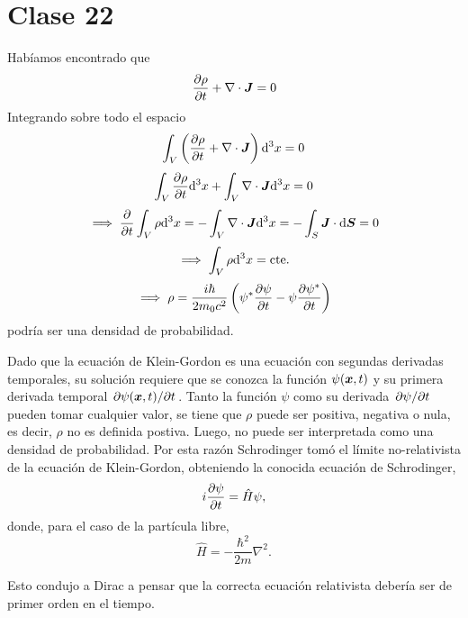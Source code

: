 \section{Clase 22}
Habíamos encontrado que
\begin{equation}
  \pdv{\rho }{t}+\nabla\cdot\vb*{J}=0
\end{equation}
Integrando sobre todo el espacio
\begin{equation}
  \int_V\left(\pdv{\rho }{t}+\nabla\cdot\vb*{J}\right)\dd^3x=0
\end{equation}
\begin{equation}
  \int_V\pdv{\rho }{t}\dd^3x+\int_V\nabla\cdot\vb*{J}\dd^3x=0
\end{equation}
\begin{equation}
  \implies \pdv{t}\int_V \rho\dd^3x=-\int_V\nabla\cdot\vb*{J}\dd^3x=-\int_S\vb*{J}\cdot \dd\vb*{S}=0
\end{equation}
\begin{equation}
  \implies \int_V\rho\dd^3x=\rm cte.
\end{equation}
\begin{equation}
  \implies \rho=\frac{i\hbar}{2m_0c^2}\left(\psi^*\pdv{\psi}{t}-\psi\pdv{\psi^*}{t}\right)
\end{equation}
podría ser una densidad de probabilidad.

Dado que la ecuación de Klein-Gordon es una ecuación con segundas derivadas temporales, su solución requiere que se conozca la función $\psi(\vb*{x},t) $ y su primera derivada temporal $\pdv*{\psi(\vb*{x},t)}{t}$. Tanto la función $\psi$ como su derivada $\pdv*{\psi}{t}$ pueden tomar cualquier valor, se tiene que $\rho$ puede ser positiva, negativa o nula, es decir, $\rho$ no es definida postiva. Luego, no puede ser interpretada como una densidad de probabilidad. Por esta razón Schrodinger tomó el límite no-relativista de la ecuación de Klein-Gordon, obteniendo la conocida ecuación de Schrodinger,
\begin{equation}
  i\pdv{\psi}{t}=\hat{H}\psi,
\end{equation}
donde, para el caso de la partícula libre,
\begin{equation}
  \hat{H}=-\frac{\hbar^2}{2m}\nabla^2.
\end{equation}

Esto condujo a Dirac a pensar que la correcta ecuación relativista debería ser de primer orden en el tiempo.

